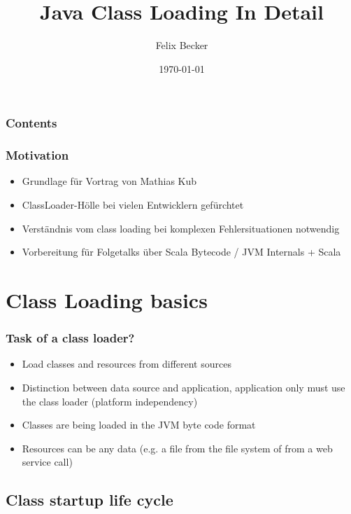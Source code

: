 \documentclass[aspectratio=169]{beamer}
\title{Java Class Loading In Detail}
\author{Felix Becker}
\date{\today}
\institute{Amsterdam.scala}
\begin{document}
\maketitle


\begin{frame}
	\frametitle{Contents}
	\tableofcontents
\end{frame}


\begin{frame}
	\frametitle{Motivation}
	\begin{itemize}
		\item{Grundlage für Vortrag von Mathias Kub}
		\item{ClassLoader-Hölle bei vielen Entwicklern gefürchtet}
		\item{Verständnis vom class loading bei komplexen Fehlersituationen notwendig}
		\item{Vorbereitung für Folgetalks über Scala Bytecode / JVM Internals + Scala}
	\end{itemize}
\end{frame}

\section{Class Loading basics}

\begin{frame}
	\frametitle{Task of a class loader?}
	\begin{itemize}
		\item{Load classes and resources from different sources}
		\item{Distinction between data source and application, application only must use the class loader (platform independency)}
		\item{Classes are being loaded in the JVM byte code format}
		\item{Resources can be any data (e.g. a file from the file system of from a web service call)}
	\end{itemize}
\end{frame}

\subsection{Class startup life cycle}
\end{document}
